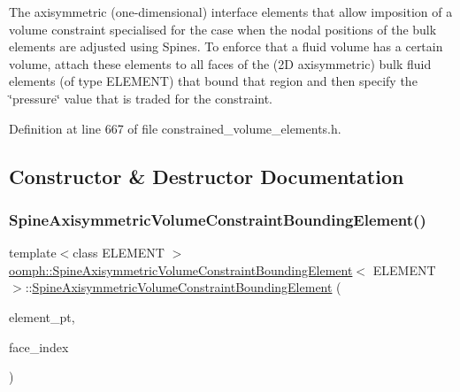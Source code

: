 The axisymmetric (one-\/dimensional) interface elements that allow imposition of a volume constraint specialised for the case when the nodal positions of the bulk elements are adjusted using Spines. To enforce that a fluid volume has a certain volume, attach these elements to all faces of the (2D axisymmetric) bulk fluid elements (of type E\+L\+E\+M\+E\+NT) that bound that region and then specify the \char`\"{}pressure\char`\"{} value that is traded for the constraint. 

Definition at line 667 of file constrained\+\_\+volume\+\_\+elements.\+h.



\subsection{Constructor \& Destructor Documentation}
\mbox{\label{classoomph_1_1SpineAxisymmetricVolumeConstraintBoundingElement_a5b9c09e04e27442d00950c9bf513657e}} 
\subsubsection{\texorpdfstring{Spine\+Axisymmetric\+Volume\+Constraint\+Bounding\+Element()}{SpineAxisymmetricVolumeConstraintBoundingElement()}}
{\footnotesize\ttfamily template$<$class E\+L\+E\+M\+E\+NT $>$ \\
\hyperlink{classoomph_1_1SpineAxisymmetricVolumeConstraintBoundingElement}{oomph\+::\+Spine\+Axisymmetric\+Volume\+Constraint\+Bounding\+Element}$<$ E\+L\+E\+M\+E\+NT $>$\+::\hyperlink{classoomph_1_1SpineAxisymmetricVolumeConstraintBoundingElement}{Spine\+Axisymmetric\+Volume\+Constraint\+Bounding\+Element} (\begin{DoxyParamCaption}\item[{\hyperlink{classoomph_1_1FiniteElement}{Finite\+Element} $\ast$const \&}]{element\+\_\+pt,  }\item[{const int \&}]{face\+\_\+index }\end{DoxyParamCaption})\hspace{0.3cm}{\ttfamily [inline]}}



